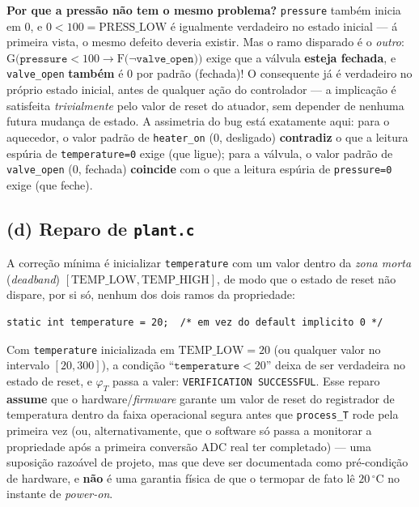 \documentclass[12pt,a4paper]{article}
\newcommand{\LG}[1]{\mathrm{G}\bigl(#1\bigr)}
\newcommand{\LF}[1]{\mathrm{F}\bigl(#1\bigr)}
\newcommand{\vv}[1]{\texttt{#1}}
\begin{document}
\begin{tcolorbox}[notabox]
\textbf{Por que a press\~ao n\~ao tem o mesmo problema?} \vv{pressure} tamb\'em inicia em
0, e $0 < 100 = \mathrm{PRESS\_LOW}$ \'e igualmente verdadeiro no estado inicial --- \'a
primeira vista, o mesmo defeito deveria existir. Mas o ramo disparado \'e o \emph{outro}:
$\LG{\vv{pressure}<100 \rightarrow \LF{\neg\vv{valve\_open}}}$ exige que a v\'alvula
\textbf{esteja fechada}, e \vv{valve\_open} \textbf{tamb\'em} \'e 0 por padr\~ao (fechada)!
O consequente j\'a \'e verdadeiro no pr\'oprio estado inicial, antes de qualquer a\c{c}\~ao
do controlador --- a implica\c{c}\~ao \'e satisfeita \emph{trivialmente} pelo valor de
reset do atuador, sem depender de nenhuma futura mudan\c{c}a de estado. A assimetria do
bug est\'a exatamente aqui: para o aquecedor, o valor padr\~ao de \vv{heater\_on} (0,
desligado) \textbf{contradiz} o que a leitura esp\'uria de \vv{temperature=0} exige (que
ligue); para a v\'alvula, o valor padr\~ao de \vv{valve\_open} (0, fechada) \textbf{coincide}
com o que a leitura esp\'uria de \vv{pressure=0} exige (que feche).
\end{tcolorbox}

\subsection{(d) Reparo de \texttt{plant.c}}

A corre\c{c}\~ao m\'inima \'e inicializar \vv{temperature} com um valor dentro da
\emph{zona morta} (\emph{deadband}) $[\mathrm{TEMP\_LOW},\mathrm{TEMP\_HIGH}]$, de modo que
o estado de reset n\~ao dispare, por si s\'o, nenhum dos dois ramos da propriedade:

\begin{lstlisting}[style=cstyle]
static int temperature = 20;  /* em vez do default implicito 0 */
\end{lstlisting}

\begin{tcolorbox}[resultbox]
Com \vv{temperature} inicializada em $\mathrm{TEMP\_LOW}=20$ (ou qualquer valor no
intervalo $[20,300]$), a condi\c{c}\~ao ``$\vv{temperature}<20$'' deixa de ser verdadeira
no estado de reset, e $\varphi_T$ passa a valer: \texttt{VERIFICATION SUCCESSFUL}. Esse
reparo \textbf{assume} que o hardware/\emph{firmware} garante um valor de reset do
registrador de temperatura dentro da faixa operacional segura antes que \vv{process\_T}
rode pela primeira vez (ou, alternativamente, que o software s\'o passa a monitorar a
propriedade ap\'os a primeira convers\~ao ADC real ter completado) --- uma suposi\c{c}\~ao
razo\'avel de projeto, mas que deve ser documentada como pr\'e-condi\c{c}\~ao de hardware,
e \textbf{n\~ao} \'e uma garantia f\'isica de que o termopar de fato l\^e $20\,^{\circ}$C no
instante de \emph{power-on}.
\end{tcolorbox}
\end{document}
